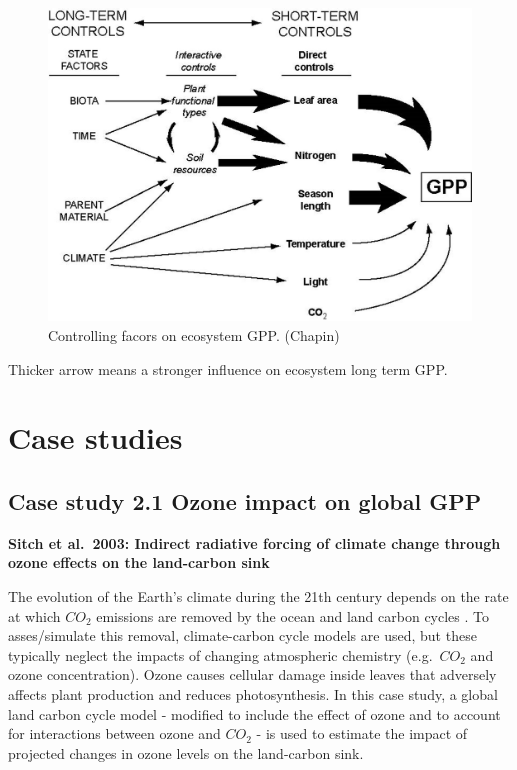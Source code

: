 \documentclass[
  12pt,
  oneside]{book}
\begin{document}
\begin{figure}

{\centering \includegraphics[width=0.8\linewidth]{figures/chap2/GPPcontrols} 

}

\caption{Controlling facors on ecosystem GPP. (Chapin)}\label{fig:f222}
\end{figure}

Thicker arrow means a stronger influence on ecosystem long term GPP.

\hypertarget{case-studies}{%
\section{Case studies}\label{case-studies}}

\hypertarget{case-study-2.1-ozone-impact-on-global-gpp}{%
\subsection{Case study 2.1 Ozone impact on global GPP}\label{case-study-2.1-ozone-impact-on-global-gpp}}

\textbf{Sitch et al.~2003: Indirect radiative forcing of climate change through ozone effects on the land-carbon sink}

The evolution of the Earth's climate during the 21th century depends on the rate at which \(CO_2\) emissions are removed by the ocean and land carbon cycles . To asses/simulate this removal, climate-carbon cycle models are used, but these typically neglect the impacts of changing atmospheric chemistry (e.g.~\(CO_2\) and ozone concentration). Ozone causes cellular damage inside leaves that adversely affects plant production and reduces photosynthesis. In this case study, a global land carbon cycle model - modified to include the effect of ozone and to account for interactions between ozone and \(CO_2\) - is used to estimate the impact of projected changes in ozone levels on the land-carbon sink.
\end{document}
